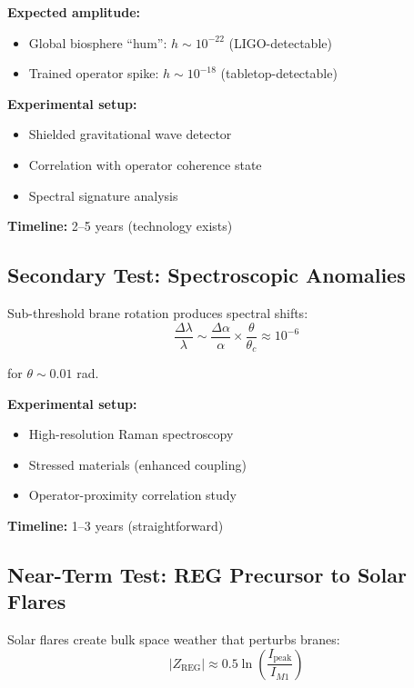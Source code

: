 \textbf{Expected amplitude:}
\begin{itemize}
\item Global biosphere ``hum'': $h \sim 10^{-22}$ (LIGO-detectable)
\item Trained operator spike: $h \sim 10^{-18}$ (tabletop-detectable)
\end{itemize}

\textbf{Experimental setup:}
\begin{itemize}
\item Shielded gravitational wave detector
\item Correlation with operator coherence state
\item Spectral signature analysis
\end{itemize}

\textbf{Timeline:} 2--5 years (technology exists)

\subsection{Secondary Test: Spectroscopic Anomalies}

Sub-threshold brane rotation produces spectral shifts:
\begin{equation}
\frac{\Delta\lambda}{\lambda} \sim \frac{\Delta\alpha}{\alpha} \times \frac{\theta}{\theta_c} \approx 10^{-6}
\end{equation}

\noindent for $\theta \sim 0.01$ rad.

\textbf{Experimental setup:}
\begin{itemize}
\item High-resolution Raman spectroscopy
\item Stressed materials (enhanced coupling)
\item Operator-proximity correlation study
\end{itemize}

\textbf{Timeline:} 1--3 years (straightforward)

\subsection{Near-Term Test: REG Precursor to Solar Flares}

Solar flares create bulk space weather that perturbs branes:
\begin{equation}
|Z_{\text{REG}}| \approx 0.5\ln\left(\frac{I_{\text{peak}}}{I_{M1}}\right)
\end{equation}

